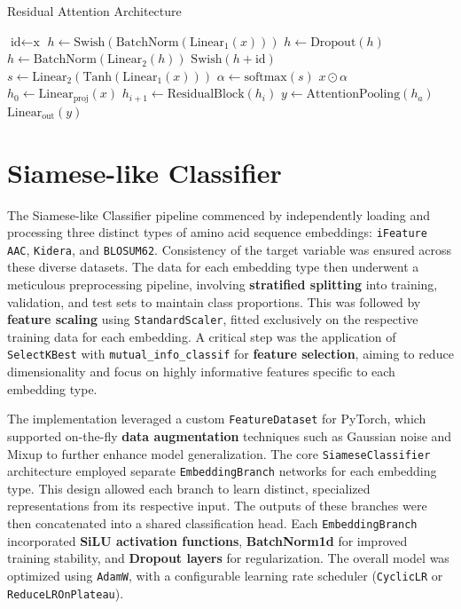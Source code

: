 \documentclass{article}
\begin{document}
\begin{algorithm}
\caption{Residual Attention Architecture}
\begin{algorithmic}[1]
\Statex
{}
    \State $\text{id} \gets \text{x}$
    \State $h \gets \text{Swish}(\text{BatchNorm}(\text{Linear}_1(x)))$
    \State $h \gets \text{Dropout}(h)$
    \State $h \gets \text{BatchNorm}(\text{Linear}_2(h))$
    \State \Return $\text{Swish}(h + \text{id})$
\EndFunction
\Statex
{}
    \State $s \gets \text{Linear}_2(\text{Tanh}(\text{Linear}_1(x)))$ 
    \State $\alpha \gets \text{softmax}(s)$ 
    \State \Return $x \odot \alpha$ 
\EndFunction
\Statex
{}
    \State $h_0 \gets \text{Linear}_{\text{proj}}(x)$ 
    \State $h_{i+1} \gets \text{ResidualBlock}(h_i)$
    \State $y \gets \text{AttentionPooling}(h_a)$
    \State \Return $\text{Linear}_{\text{out}}(y)$ 
\EndFunction
\end{algorithmic}
\end{algorithm}

\section{Siamese-like Classifier}
The Siamese-like Classifier pipeline commenced by independently loading and processing three distinct types of amino acid sequence embeddings: \texttt{iFeature AAC}, \texttt{Kidera}, and \texttt{BLOSUM62}. Consistency of the target variable was ensured across these diverse datasets. The data for each embedding type then underwent a meticulous preprocessing pipeline, involving \textbf{stratified splitting} into training, validation, and test sets to maintain class proportions. This was followed by \textbf{feature scaling} using \texttt{StandardScaler}, fitted exclusively on the respective training data for each embedding. A critical step was the application of \texttt{SelectKBest} with \texttt{mutual\_info\_classif} for \textbf{feature selection}, aiming to reduce dimensionality and focus on highly informative features specific to each embedding type.

The implementation leveraged a custom \texttt{FeatureDataset} for PyTorch, which supported on-the-fly \textbf{data augmentation} techniques such as Gaussian noise and Mixup to further enhance model generalization. The core \texttt{SiameseClassifier} architecture employed separate \texttt{EmbeddingBranch} networks for each embedding type. This design allowed each branch to learn distinct, specialized representations from its respective input. The outputs of these branches were then concatenated into a shared classification head. Each \texttt{EmbeddingBranch} incorporated \textbf{SiLU activation functions}, \textbf{BatchNorm1d} for improved training stability, and \textbf{Dropout layers} for regularization. The overall model was optimized using \texttt{AdamW}, with a configurable learning rate scheduler (\texttt{CyclicLR} or \texttt{ReduceLROnPlateau}).
\end{document}

